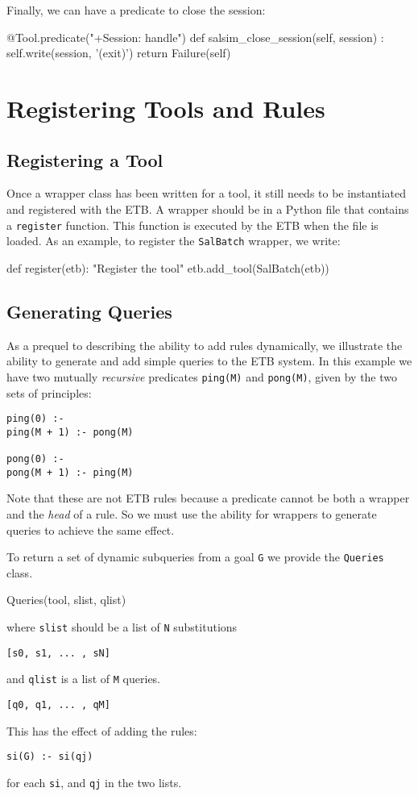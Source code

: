 \documentclass{article}
\begin{document}
Finally, we can have a predicate to close the session:
\begin{pythoncode}
    @Tool.predicate("+Session: handle")
    def salsim_close_session(self, session) :
        self.write(session, '(exit)\n')
        return Failure(self)
\end{pythoncode}

\section{Registering Tools and Rules}

\subsection{Registering a Tool}

Once a wrapper class has been written for a tool, it still needs to be
instantiated and registered with the ETB. A wrapper should be in a
Python file that contains a {\tt register} function. This function is
executed by the ETB when the file is loaded. As an example, to
register the {\tt SalBatch} wrapper, we write:
\begin{pythoncode}
def register(etb):
  "Register the tool"
  etb.add_tool(SalBatch(etb))
\end{pythoncode}


\subsection{Generating Queries}

As a prequel to describing the ability to add rules dynamically,
we illustrate the ability to generate and add simple queries
to the ETB system.
In this example we have two mutually {\em recursive} predicates
{\tt ping(M)} and {\tt pong(M)}, given by the two sets of principles:
\begin{verbatim}
ping(0) :- 
ping(M + 1) :- pong(M) 

pong(0) :- 
pong(M + 1) :- ping(M) 
\end{verbatim}
Note that these are not ETB rules because a predicate cannot
be both a wrapper and the {\em head} of a rule. So we must use
the ability for wrappers to generate queries to achieve the
same effect.


To return a set of dynamic subqueries from a goal {\tt G} we provide the {\tt Queries} class.
\begin{pythoncode}
  Queries(tool, slist, qlist)
\end{pythoncode}
where  {\tt slist} should be a list of {\tt N} substitutions
\begin{verbatim}
[s0, s1, ... , sN]
\end{verbatim}
and {\tt qlist} is a list of {\tt M} queries.
\begin{verbatim}
[q0, q1, ... , qM]
\end{verbatim}
This has the effect of adding the rules:
\begin{verbatim}
si(G) :- si(qj)
\end{verbatim}
for each {\tt si}, and {\tt qj} in the two lists.
\end{document}
